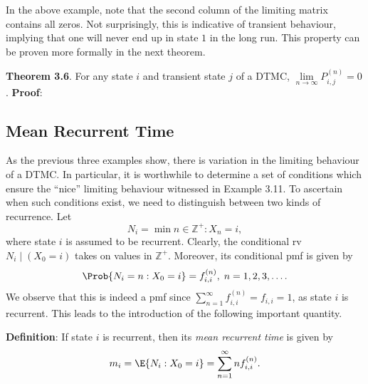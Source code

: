 In the above example, note that the second column of the limiting matrix contains all zeros.
Not surprisingly, this is indicative of transient behaviour, implying that one will never end up in
state $1$ in the long run. This property can be proven more formally in the next theorem.
\begin{Result}
    \textbf{Theorem 3.6}. For any state $i$ and transient state $j$ of a DTMC,
    $ \lim\limits_{{n} \to {\infty}} P_{i,j}^{(n)}=0 $.
    \tcblower{}
    \textbf{Proof}:
\end{Result}
\subsection*{Mean Recurrent Time}
As the previous three examples show, there is variation in the limiting behaviour of a DTMC\@.
In particular, it is worthwhile to determine a set of conditions which ensure the ``nice'' limiting
behaviour witnessed in Example 3.11. To ascertain when such conditions exist, we need to
distinguish between two kinds of recurrence. Let
\[ N_i=\min{n\in\mathbb{Z}^+:X_n=i}, \]
where state $ i $ is assumed to be recurrent. Clearly, the conditional rv $ N_i\mid(X_0=i) $ takes
on values in $ \mathbb{Z}^+ $. Moreover, its conditional pmf is given by
\[ \Prob{N_i=n\given X_0=i}=f_{i,i}^{(n)},\;n=1,2,3,\ldots. \]
We observe that this is indeed a pmf since $ \sum_{n=1}^{\infty} f_{i,i}^{(n)}=f_{i,i}=1 $,
as state $ i $ is recurrent. This
leads to the introduction of the following important quantity.
\begin{Regular}
    \textbf{Definition}: If state $ i $ is recurrent, then its \emph{mean recurrent time} is given by
    \[ m_i=\E{N_i\given X_0=i}=\sum_{n=1}^{\infty} n f_{i,i}^{(n)}. \]
\end{Regular}
